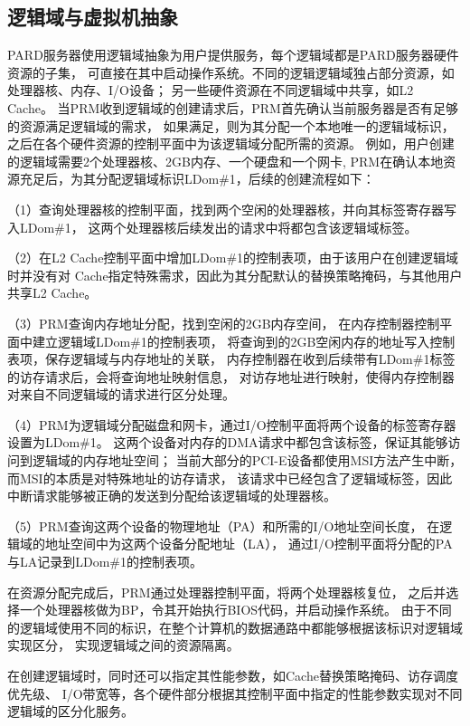 \subsection{逻辑域与虚拟机抽象}

PARD服务器使用逻辑域抽象为用户提供服务，每个逻辑域都是PARD服务器硬件资源的子集，
可直接在其中启动操作系统。不同的逻辑逻辑域独占部分资源，如处理器核、内存、I/O设备；
另一些硬件资源在不同逻辑域中共享，如L2 Cache。
当PRM收到逻辑域的创建请求后，PRM首先确认当前服务器是否有足够的资源满足逻辑域的需求，
如果满足，则为其分配一个本地唯一的逻辑域标识，
之后在各个硬件资源的控制平面中为该逻辑域分配所需的资源。
例如，用户创建的逻辑域需要2个处理器核、2GB内存、一个硬盘和一个网卡,
PRM在确认本地资源充足后，为其分配逻辑域标识LDom\#1，后续的创建流程如下：

（1）查询处理器核的控制平面，找到两个空闲的处理器核，并向其标签寄存器写入LDom\#1，
这两个处理器核后续发出的请求中将都包含该逻辑域标签。

（2）在L2 Cache控制平面中增加LDom\#1的控制表项，由于该用户在创建逻辑域时并没有对
Cache指定特殊需求，因此为其分配默认的替换策略掩码，与其他用户共享L2 Cache。

（3）PRM查询内存地址分配，找到空闲的2GB内存空间，
在内存控制器控制平面中建立逻辑域LDom\#1的控制表项，
将查询到的2GB空闲内存的地址写入控制表项，保存逻辑域与内存地址的关联，
内存控制器在收到后续带有LDom\#1标签的访存请求后，会将查询地址映射信息，
对访存地址进行映射，使得内存控制器对来自不同逻辑域的请求进行区分处理。

（4）PRM为逻辑域分配磁盘和网卡，通过I/O控制平面将两个设备的标签寄存器设置为LDom\#1。
这两个设备对内存的DMA请求中都包含该标签，保证其能够访问到逻辑域的内存地址空间；
当前大部分的PCI-E设备都使用MSI方法产生中断，而MSI的本质是对特殊地址的访存请求，
该请求中已经包含了逻辑域标签，因此中断请求能够被正确的发送到分配给该逻辑域的处理器核。

（5）PRM查询这两个设备的物理地址（PA）和所需的I/O地址空间长度，
在逻辑域的地址空间中为这两个设备分配地址（LA），
通过I/O控制平面将分配的PA与LA记录到LDom\#1的控制表项。

在资源分配完成后，PRM通过处理器控制平面，将两个处理器核复位，
之后并选择一个处理器核做为BP，令其开始执行BIOS代码，并启动操作系统。
由于不同的逻辑域使用不同的标识，在整个计算机的数据通路中都能够根据该标识对逻辑域实现区分，
实现逻辑域之间的资源隔离。

在创建逻辑域时，同时还可以指定其性能参数，如Cache替换策略掩码、访存调度优先级、
I/O带宽等，各个硬件部分根据其控制平面中指定的性能参数实现对不同逻辑域的区分化服务。


